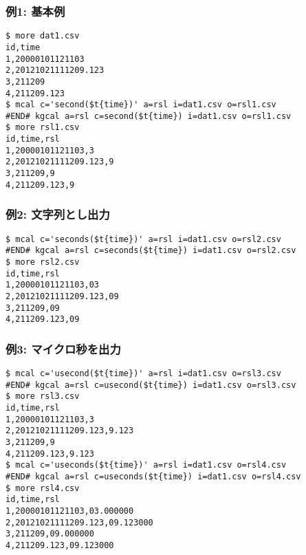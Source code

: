 \subsubsection*{例1: 基本例}



\begin{Verbatim}[baselinestretch=0.7,frame=single]
$ more dat1.csv
id,time
1,20000101121103
2,20121021111209.123
3,211209
4,211209.123
$ mcal c='second($t{time})' a=rsl i=dat1.csv o=rsl1.csv
#END# kgcal a=rsl c=second($t{time}) i=dat1.csv o=rsl1.csv
$ more rsl1.csv
id,time,rsl
1,20000101121103,3
2,20121021111209.123,9
3,211209,9
4,211209.123,9
\end{Verbatim}
\subsubsection*{例2: 文字列とし出力}



\begin{Verbatim}[baselinestretch=0.7,frame=single]
$ mcal c='seconds($t{time})' a=rsl i=dat1.csv o=rsl2.csv
#END# kgcal a=rsl c=seconds($t{time}) i=dat1.csv o=rsl2.csv
$ more rsl2.csv
id,time,rsl
1,20000101121103,03
2,20121021111209.123,09
3,211209,09
4,211209.123,09
\end{Verbatim}
\subsubsection*{例3: マイクロ秒を出力}



\begin{Verbatim}[baselinestretch=0.7,frame=single]
$ mcal c='usecond($t{time})' a=rsl i=dat1.csv o=rsl3.csv
#END# kgcal a=rsl c=usecond($t{time}) i=dat1.csv o=rsl3.csv
$ more rsl3.csv
id,time,rsl
1,20000101121103,3
2,20121021111209.123,9.123
3,211209,9
4,211209.123,9.123
$ mcal c='useconds($t{time})' a=rsl i=dat1.csv o=rsl4.csv
#END# kgcal a=rsl c=useconds($t{time}) i=dat1.csv o=rsl4.csv
$ more rsl4.csv
id,time,rsl
1,20000101121103,03.000000
2,20121021111209.123,09.123000
3,211209,09.000000
4,211209.123,09.123000
\end{Verbatim}
